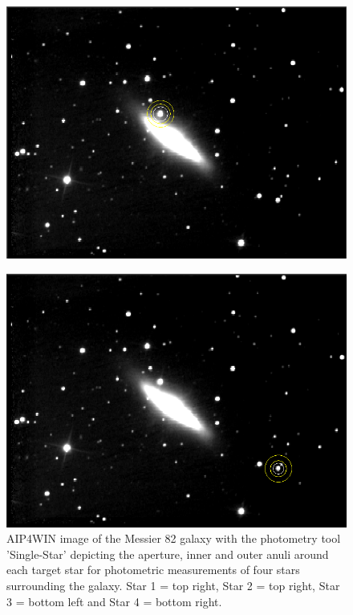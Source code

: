 \documentclass[12pt]{article}
\begin{document}
\begin{figure}[H]
\begin{multicols}{2}
\begin{minipage}[H]{0.5\textwidth}
\includegraphics[scale=0.43]{Images/AsImages/SS/Sr2-Aperture.PNG} \\
\end{minipage}
\begin{minipage}[H]{0.5\textwidth}
\includegraphics[scale=0.43]{Images/AsImages/SS/Sr4-Aperture.PNG}
\end{minipage}
\end{multicols}
\caption{AIP4WIN image of the Messier 82 galaxy with the photometry tool 'Single-Star' depicting the aperture, inner and outer anuli around each target star for photometric measurements of four stars surrounding the galaxy. Star 1 = top right, Star 2 = top right, Star 3 = bottom left and Star 4 = bottom right.}
\label{SS-Aperture}
\end{figure}
\end{document}
